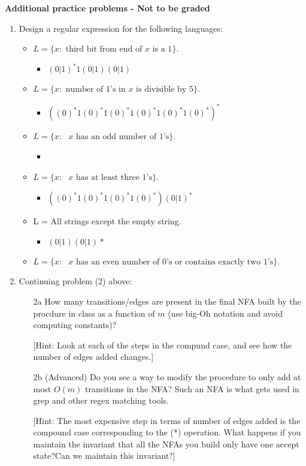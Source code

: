 \documentclass[11pt]{article}
\begin{document}
{\bf Additional practice problems - Not to be graded}

\begin{enumerate}

\item Design a regular expression for the following languages: 
\begin{itemize}
\item $L = \{x: \text{ third bit from end of $x$ is a 1}\}$.
\begin{itemize}
    \item $(0|1)^*1(0|1)(0|1)$
\end{itemize}
\item $L = \{x: \text{ number of $1$'s in $x$ is divisible by $5$}\}$.
\begin{itemize}
    \item $((0)^*1(0)^*1(0)^*1(0)^*1(0)^*1(0)^*)^*$
\end{itemize}
\item $L = \{x: \text{ $x$ has an odd number of $1$'s}\}$. 
\begin{itemize}
    \item 
\end{itemize}
\item $L = \{x: \text{ $x$ has at least three $1$'s}\}$.
\begin{itemize}
    \item $((0)^*1(0)^*1(0)^*1(0)^*)(0|1)^*$
\end{itemize}
\item L = All strings except the empty string.
\begin{itemize}
    \item $(0|1)(0|1)*$
\end{itemize}
\item $L = \{x: \text{ $x$ has an even number of $0$'s or contains exactly two $1$'s}\}$.
\end{itemize}

\item Continuing problem (2) above:
\begin{enumerate}
\item[2a] How many transitions/edges are present in the final NFA built by the procdure in class as a function of $m$ (use big-Oh notation and avoid computing constants)?

[Hint: Look at each of the steps in the compund case, and see how the number of edges added changes.] 

\item[2b] (Advanced) Do you see a way to modify the procedure to only add at most $O(m)$ transitions in the NFA? Such an NFA is what gets used in grep and other regex matching tools.

[Hint: The most expensive step in terms of number of edges added is the compound case corresponding to the (*) operation. What happens if you maintain the invariant that all the NFAs you build only have one accept state?Can we maintain this invariant?]
\end{enumerate}


\end{enumerate}
\end{document}

